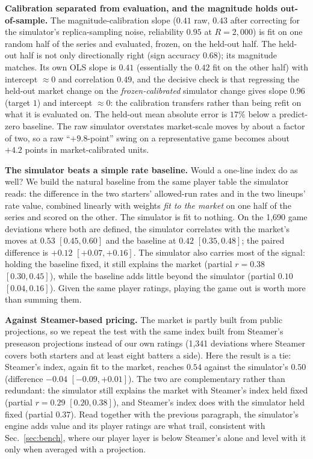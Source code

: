 \documentclass[10pt,twocolumn]{article}
\begin{document}
\textbf{Calibration separated from evaluation, and the magnitude holds out-of-sample.} The
magnitude-calibration slope ($0.41$ raw, $0.43$ after correcting for the simulator's replica-sampling
noise, reliability $0.95$ at $R{=}2{,}000$) is fit on one random half of the series and evaluated, frozen, on
the held-out half. The held-out half is not only directionally right (sign accuracy $0.68$); its
magnitude matches. Its own OLS slope is $0.41$ (essentially the $0.42$ fit on the other half) with
intercept $\approx0$ and correlation $0.49$, and the decisive check is that regressing the held-out
market change on the \emph{frozen-calibrated} simulator change gives slope $0.96$ (target $1$) and
intercept $\approx0$: the calibration transfers rather than being refit on what it is evaluated on. The
held-out mean absolute error is $17\%$ below a predict-zero baseline. The raw simulator overstates
market-scale moves by about a factor of two, so a raw ``$+9.8$-point'' swing on a representative game
becomes about $+4.2$ points in market-calibrated units.

\textbf{The simulator beats a simple rate baseline.} Would a one-line index do as well? We build the
natural baseline from the same player table the simulator reads: the difference in the two starters'
allowed-run rates and in the two lineups' rate value, combined linearly with weights \emph{fit to the
market} on one half of the series and scored on the other. The simulator is fit to nothing. On the
1{,}690 game deviations where both are defined, the simulator correlates with the market's moves at
$0.53$ $[0.45,0.60]$ and the baseline at $0.42$ $[0.35,0.48]$; the paired difference is $+0.12$
$[+0.07,+0.16]$. The simulator also carries most of the signal: holding the baseline fixed, it still
explains the market (partial $r{=}0.38$ $[0.30,0.45]$), while the baseline adds little beyond the
simulator (partial $0.10$ $[0.04,0.16]$). Given the same player ratings, playing the game out is worth
more than summing them.

\textbf{Against Steamer-based pricing.} The market is partly built from public projections, so we
repeat the test with the same index built from Steamer's preseason projections instead of our own
ratings (1{,}341 deviations where Steamer covers both starters and at least eight batters a side).
Here the result is a tie: Steamer's index, again fit to the market, reaches $0.54$ against the
simulator's $0.50$ (difference $-0.04$ $[-0.09,+0.01]$). The two are complementary rather than
redundant: the simulator still explains the market with Steamer's index held fixed (partial $r{=}0.29$
$[0.20,0.38]$), and Steamer's index does with the simulator held fixed (partial $0.37$). Read together
with the previous paragraph, the simulator's engine adds value and its player ratings are what trail,
consistent with Sec.~\ref{sec:bench}, where our player layer is below Steamer's alone and level with it
only when averaged with a projection.
\end{document}
